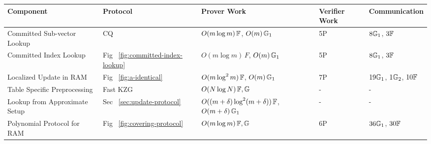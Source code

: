 \begin{table}[bt]
    \begin{tabular}{l|l|l|l|l}
        \hline
        {\bf Component  }                                                                                      & {\bf Protocol} & {\bf Prover Work}      & {\bf Verifier Work} & {\bf Communication}   \\ \hline
        Committed Sub-vector Lookup                                                                     & CQ ~\cite{EPRINT:EagFioGab22}      & $O(m \log m)\,\mathbb{F}$, $O(m)\,\mathbb{G}_1$      & 5P            & $8\mathbb{G}_1$, $3\mathbb{F}$         \\ \hline
        Committed Index Lookup                                                                          & Fig ~\ref{fig:committed-index-lookup}    & $O(m \log m)\,F$, $O(m)\,\mathbb{G}_1$      & 5P            & $8\mathbb{G}_1$, $3\mathbb{F}$         \\ \hline
        Localized Update in RAM                                                                                & Fig ~\ref{fig:a-identical}   & $O(m \log^2 m)\, \mathbb{F}$, $O(m)\,\mathbb{G}_1$      & 7P            & $19\mathbb{G}_1$, $1\mathbb{G}_2$, $10\mathbb{F}$ \\ \hline
        Table Specific Preprocessing                                                                    & Fast KZG ~\cite{EPRINT:FeiKho23}      & $O(N \log N)\,\mathbb{F},\mathbb{G}$      & -             & -               \\ \hline
        Lookup from Approximate Setup                                                                   & Sec ~\ref{sec:update-protocol}    & $O((m+\delta)\log^2(m+\delta))\,\mathbb{F}$, $O(m+\delta)\,\mathbb{G}_1$ & -             & -               \\ \hline
        Polynomial Protocol for RAM                                                                     & Fig ~\ref{fig:covering-protocol}   & $O(m \log m)\, \mathbb{F},\mathbb{G}$      & 6P            & $36\mathbb{G}_1$, $30\mathbb{F}$       \\ \hline

\end{tabular}
\end{table}
